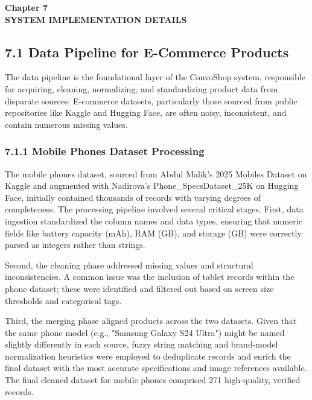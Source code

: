 \newpage
\begin{center}
{\fontsize{14}{17}\bfseries Chapter 7\\[6pt]}
{\fontsize{16}{20}\bfseries SYSTEM IMPLEMENTATION DETAILS\\[10pt]}
\end{center}

\subsection*{7.1 Data Pipeline for E-Commerce Products}
The data pipeline is the foundational layer of the ConvoShop system, responsible for acquiring, cleaning, normalizing, and standardizing product data from disparate sources. E-commerce datasets, particularly those sourced from public repositories like Kaggle and Hugging Face, are often noisy, inconsistent, and contain numerous missing values. 

\subsubsection*{7.1.1 Mobile Phones Dataset Processing}
The mobile phones dataset, sourced from Abdul Malik's 2025 Mobiles Dataset on Kaggle and augmented with Nadirova's Phone\_SpecsDataset\_25K on Hugging Face, initially contained thousands of records with varying degrees of completeness. The processing pipeline involved several critical stages. First, data ingestion standardized the column names and data types, ensuring that numeric fields like battery capacity (mAh), RAM (GB), and storage (GB) were correctly parsed as integers rather than strings. 

Second, the cleaning phase addressed missing values and structural inconsistencies. A common issue was the inclusion of tablet records within the phone dataset; these were identified and filtered out based on screen size thresholds and categorical tags. 

Third, the merging phase aligned products across the two datasets. Given that the same phone model (e.g., "Samsung Galaxy S24 Ultra") might be named slightly differently in each source, fuzzy string matching and brand-model normalization heuristics were employed to deduplicate records and enrich the final dataset with the most accurate specifications and image references available. The final cleaned dataset for mobile phones comprised 271 high-quality, verified records.

